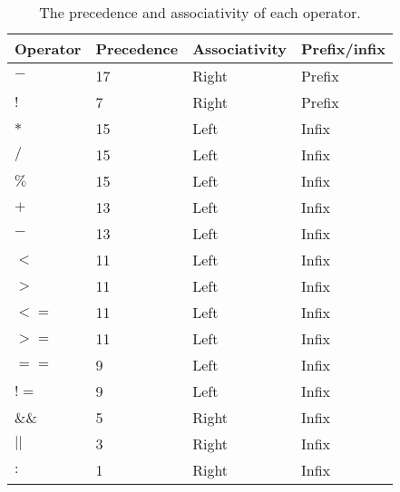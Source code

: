 \begin{table}[!ht]
\centering
\begin{tabular}{|l|l|l|l|}
\hline
\textbf{Operator} & \textbf{Precedence} & \textbf{Associativity} & \textbf{Prefix/infix} \\ \hline
$-$ & 17 & Right & Prefix \\ \hline
$!$ & 7 & Right & Prefix \\ \hline
$*$ & 15 & Left & Infix \\ \hline
$/$ & 15 & Left & Infix \\ \hline
$\%$ & 15 & Left & Infix \\ \hline
$+$ & 13 & Left & Infix \\ \hline
$-$ & 13 & Left & Infix \\ \hline
$<$ & 11 & Left & Infix \\ \hline
$>$ & 11 & Left & Infix \\ \hline
$<=$ & 11 & Left & Infix \\ \hline
$>=$ & 11 & Left & Infix \\ \hline
$==$ & 9 & Left & Infix \\ \hline
$!=$ & 9 & Left & Infix \\ \hline
$\&\&$ & 5 & Right & Infix \\ \hline
$||$ & 3 & Right & Infix \\ \hline
$:$ & 1 & Right & Infix \\ \hline
\end{tabular}
\caption{The precedence and associativity of each operator.}
\label{table:precedence}
\end{table}

